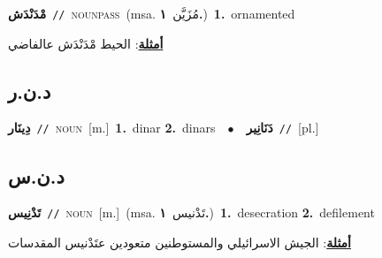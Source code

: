 \documentclass[10pt,a4paper,twoside]{article} %
\begin{document}
\begin{multicols}{2}
{\setlength\topsep{0pt}\textbf{\foreignlanguage{arabic}{مْدَنْدَش}}\ {\color{gray}\texttt{//}\color{black}}\ \textsc{noun\textunderscore pass}\ \color{gray}(msa. \foreignlanguage{arabic}{مُزَيَّن}~\foreignlanguage{arabic}{\textbf{١.}})\color{black}\ \textbf{1.}~ornamented\  \begin{flushright}\color{gray}\foreignlanguage{arabic}{\textbf{\underline{\foreignlanguage{arabic}{أمثلة}}}: الحيط مْدَنْدَش عالفاضي}\end{flushright}\color{black}} \vspace{2mm}

\vspace{-3mm}
\subsection*{\color{blue}\foreignlanguage{arabic}{د.ن.ر}\color{blue}{ (ntws)}} 

{\setlength\topsep{0pt}\textbf{\foreignlanguage{arabic}{دِينَار}}\ {\color{gray}\texttt{//}\color{black}}\ \textsc{noun}\ [m.]\ \textbf{1.}~dinar  \textbf{2.}~dinars\ \ $\bullet$\ \ \setlength\topsep{0pt}\textbf{\foreignlanguage{arabic}{دَنَانِير}}\ {\color{gray}\texttt{//}\color{black}}\ [pl.]\ } \vspace{2mm}

\vspace{-3mm}
\subsection*{\color{blue}\foreignlanguage{arabic}{د.ن.س}\color{blue}{}} 

{\setlength\topsep{0pt}\textbf{\foreignlanguage{arabic}{تَدْنِيس}}\ {\color{gray}\texttt{//}\color{black}}\ \textsc{noun}\ [m.]\ \color{gray}(msa. \foreignlanguage{arabic}{تَدْنيس}~\foreignlanguage{arabic}{\textbf{١.}})\color{black}\ \textbf{1.}~desecration  \textbf{2.}~defilement\  \begin{flushright}\color{gray}\foreignlanguage{arabic}{\textbf{\underline{\foreignlanguage{arabic}{أمثلة}}}: الجيش الاسرائيلي والمستوطنين متعودين عتَدْنيس المقدسات}\end{flushright}\color{black}} \vspace{2mm}


\end{multicols}
\end{document}
